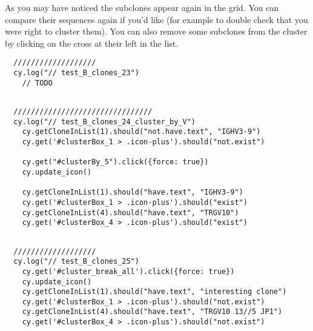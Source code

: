 As you may have noticed the subclones appear again in the grid. You can
compare their sequences again if you'd like (for example to double check that
you were right to cluster them). You can also remove some subclones from the
cluster by clicking on the cross at their left in the list.
\begin{verbatim}
  ///////////////////
  cy.log("// test_B_clones_23")
    // TODO


\end{verbatim}

\begin{verbatim}
  ////////////////////////////////
  cy.log("// test_B_clones_24_cluster_by_V")
    cy.getCloneInList(1).should("not.have.text", "IGHV3-9")
    cy.get('#clusterBox_1 > .icon-plus').should("not.exist")

    cy.get("#clusterBy_5").click({force: true})
    cy.update_icon()

    cy.getCloneInList(1).should("have.text", "IGHV3-9")
    cy.get('#clusterBox_1 > .icon-plus').should("exist")
    cy.getCloneInList(4).should("have.text", "TRGV10")
    cy.get('#clusterBox_4 > .icon-plus').should("exist")


\end{verbatim}

\begin{verbatim}
  ///////////////////
  cy.log("// test_B_clones_25")
    cy.get('#cluster_break_all').click({force: true})
    cy.update_icon()
    cy.getCloneInList(1).should("have.text", "interesting clone")
    cy.get('#clusterBox_1 > .icon-plus').should("not.exist")
    cy.getCloneInList(4).should("have.text", "TRGV10 13//5 JP1")
    cy.get('#clusterBox_4 > .icon-plus').should("not.exist")


\end{verbatim}

